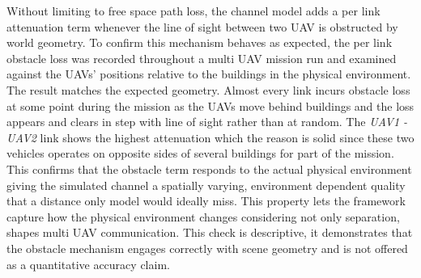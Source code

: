 Without limiting to free space path loss, the channel model adds a per link attenuation term whenever the line of sight between two UAV is obstructed by world geometry. To confirm this mechanism behaves as expected, the per link obstacle loss was recorded throughout a multi UAV mission run and examined against the UAVs' positions relative to the buildings in the physical environment. The result matches the expected geometry. Almost every link incurs obstacle loss at some point during the mission as the UAVs move behind buildings and the loss appears and clears in step with line of sight rather than at random. The \emph{UAV1 - UAV2} link shows the highest attenuation which the reason is solid since these two vehicles operates on opposite sides of several buildings for part of the mission. This confirms that the obstacle term responds to the actual physical environment giving the simulated channel a spatially varying, environment dependent quality that a distance only model would ideally miss. This property lets the framework capture how the physical environment changes considering not only separation, shapes multi UAV communication. This check is descriptive, it demonstrates that the obstacle mechanism engages correctly with scene geometry and is not offered as a quantitative accuracy claim.